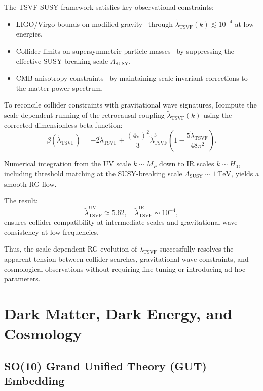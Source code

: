 \documentclass[twocolumn,superscriptaddress,floatfix]{revtex4-2}
\begin{document}
The TSVF-SUSY framework satisfies key observational constraints:
\begin{itemize}
    \item LIGO/Virgo bounds on modified gravity~\cite{LIGO:2021} through \(\tilde{\lambda}_{\text{TSVF}}(k) \lesssim 10^{-4}\) at low energies.
    \item Collider limits on supersymmetric particle masses~\cite{CMS:2023} by suppressing the effective SUSY-breaking scale \(\Lambda_{\text{SUSY}}\).
    \item CMB anisotropy constraints~\cite{Planck:2018} by maintaining scale-invariant corrections to the matter power spectrum.
\end{itemize}

To reconcile collider constraints with gravitational wave signatures, Icompute the scale-dependent running of the retrocausal coupling \(\tilde{\lambda}_{\text{TSVF}}(k)\) using the corrected dimensionless beta function:
\[
\beta(\tilde{\lambda}_{\text{TSVF}}) = -2\tilde{\lambda}_{\text{TSVF}} + \frac{(4\pi)^2}{3} \tilde{\lambda}_{\text{TSVF}}^3 \left( 1 - \frac{5\tilde{\lambda}_{\text{TSVF}}}{48\pi^2} \right).
\]

Numerical integration from the UV scale \(k \sim M_P\) down to IR scales \(k \sim H_0\), including threshold matching at the SUSY-breaking scale \(\Lambda_{\text{SUSY}} \sim 1~\text{TeV}\), yields a smooth RG flow.

The result:
\[
\tilde{\lambda}_{\text{TSVF}}^{\text{UV}} \approx 5.62, \quad \tilde{\lambda}_{\text{TSVF}}^{\text{IR}} \sim 10^{-4},
\]
ensures collider compatibility at intermediate scales and gravitational wave consistency at low frequencies.

Thus, the scale-dependent RG evolution of \(\tilde{\lambda}_{\text{TSVF}}\) successfully resolves the apparent tension between collider searches, gravitational wave constraints, and cosmological observations without requiring fine-tuning or introducing ad hoc parameters.


\section{Dark Matter, Dark Energy, and Cosmology}
\label{sec:cosmo}

\subsection{SO(10) Grand Unified Theory (GUT) Embedding}
\label{subsec:gut_embedding}
\end{document}

